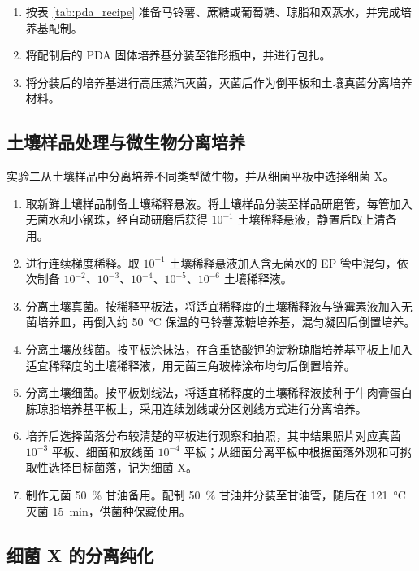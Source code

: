 \documentclass[UTF8,a4paper,12pt,fontset=none]{ctexart}
\numberwithin{figure}{section}
\begin{document}
\begin{enumerate}[label=\arabic*.]
    \item 按表 \ref{tab:pda_recipe} 准备马铃薯、蔗糖或葡萄糖、琼脂和双蒸水，并完成培养基配制。
    \item 将配制后的 PDA 固体培养基分装至锥形瓶中，并进行包扎。
    \item 将分装后的培养基进行高压蒸汽灭菌，灭菌后作为倒平板和土壤真菌分离培养材料。
\end{enumerate}

\subsection{土壤样品处理与微生物分离培养}

实验二从土壤样品中分离培养不同类型微生物，并从细菌平板中选择细菌 X。

\begin{enumerate}[label=\arabic*.]
    \item 取新鲜土壤样品制备土壤稀释悬液。将土壤样品分装至样品研磨管，每管加入无菌水和小钢珠，经自动研磨后获得 $10^{-1}$ 土壤稀释悬液，静置后取上清备用。
    \item 进行连续梯度稀释。取 $10^{-1}$ 土壤稀释悬液加入含无菌水的 EP 管中混匀，依次制备 $10^{-2}$、$10^{-3}$、$10^{-4}$、$10^{-5}$、$10^{-6}$ 土壤稀释液。
    \item 分离土壤真菌。按稀释平板法，将适宜稀释度的土壤稀释液与链霉素液加入无菌培养皿，再倒入约 \SI{50}{\celsius} 保温的马铃薯蔗糖培养基，混匀凝固后倒置培养。
    \item 分离土壤放线菌。按平板涂抹法，在含重铬酸钾的淀粉琼脂培养基平板上加入适宜稀释度的土壤稀释液，用无菌三角玻棒涂布均匀后倒置培养。
    \item 分离土壤细菌。按平板划线法，将适宜稀释度的土壤稀释液接种于牛肉膏蛋白胨琼脂培养基平板上，采用连续划线或分区划线方式进行分离培养。
    \item 培养后选择菌落分布较清楚的平板进行观察和拍照，其中结果照片对应真菌 $10^{-3}$ 平板、细菌和放线菌 $10^{-4}$ 平板；从细菌分离平板中根据菌落外观和可挑取性选择目标菌落，记为细菌 X。
    \item 制作无菌 \SI{50}{\percent} 甘油备用。配制 \SI{50}{\percent} 甘油并分装至甘油管，随后在 \SI{121}{\celsius} 灭菌 \SI{15}{min}，供菌种保藏使用。
\end{enumerate}

\subsection{细菌 X 的分离纯化}
\end{document}
